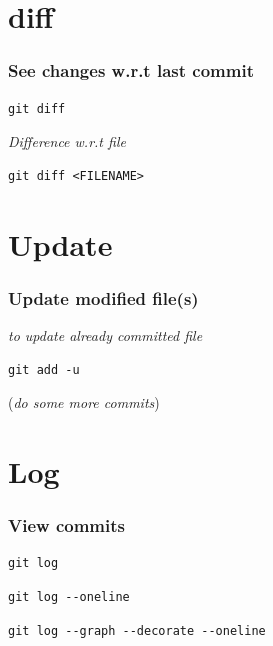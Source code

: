 \documentclass[bigger, presentation]{beamer}
\begin{document}
\section{diff}
\label{sec-6}
\begin{frame}[fragile]
\frametitle{See changes w.r.t last commit}
\label{sec-6-1}

   

\begin{verbatim}
git diff
\end{verbatim}

   \emph{Difference w.r.t file}

\begin{verbatim}
git diff <FILENAME>
\end{verbatim}
\end{frame}
\section{Update}
\label{sec-7}
\begin{frame}[fragile]
\frametitle{Update modified file(s)}
\label{sec-7-1}

   
   \emph{to update already committed file}

\begin{verbatim}
git add -u
\end{verbatim}

   (\emph{do some more commits})
\end{frame}
\section{Log}
\label{sec-8}
\begin{frame}[fragile]
\frametitle{View commits}
\label{sec-8-1}


\begin{verbatim}
git log
\end{verbatim}


\begin{verbatim}
git log --oneline
\end{verbatim}


\begin{verbatim}
git log --graph --decorate --oneline
\end{verbatim}
\end{frame}
\end{document}
